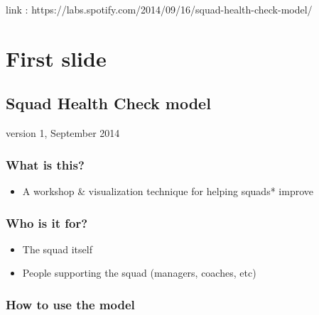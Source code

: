 \documentclass[a4paper]{article}
\begin{document}
link : https://labs.spotify.com/2014/09/16/squad-health-check-model/

\section{First slide}

\subsection{Squad Health Check model}

version 1, September 2014

\subsubsection{What is this?}

\begin{itemize}
\item A workshop \& visualization technique for helping squads* improve
\end{itemize}

\subsubsection{Who is it for?}

\begin{itemize}
\item The squad itself
\item People supporting the squad (managers, coaches, etc)
\end{itemize}

\subsubsection{How to use the model}
\end{document}

